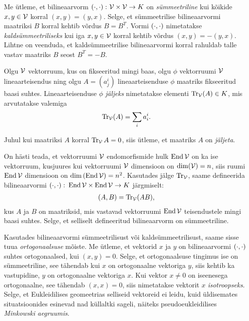 Me ütleme, et bilineaarvorm $\left( \cdot, \cdot \right) \colon \mathcal{V} \times \mathcal{V} \to K$ on
\emph{sümmeetriline} kui
kõikide $x, y \in \mathcal{V}$ korral $(x, y) = (y, x)$. Selge, et sümmeetrilise
bilineaarvormi maatriksi $B$ korral kehtib võrdus $B = B^T$. Vormi $\left( \cdot, \cdot \right)$
nimetatakse \emph{kaldsümmeetriliseks} kui iga $x, y \in \mathcal{V}$ korral kehtib
võrdus $(x, y) = - (y, x)$. Lihtne on veenduda, et kaldsümmeetrilise
bilineaarvormi korral rahuldab talle vastav maatriks $B$ seost
$B^T = -B$.

\begin{dfn}
    Olgu $\mathcal{V}$ vektorruum, kus on fikseeritud mingi baas, olgu $\phi$
    vektorruumi $\mathcal{V}$ lineaarteisendus ning olgu $A = (a^i_j)$
    lineaarteisenduse $\phi$ maatriks fikseeritud baasi suhtes.
    Lineaarteisenduse $\phi$ \emph{jäljeks} nimetatakse elementi
    $\operatorname{Tr}_{\mathcal{V}}(A) \in K$, mis arvutatakse valemiga
    \begin{align*}
        \operatorname{Tr}_{\mathcal{V}}(A) = \sum_i a^i_i.
    \end{align*}
\end{dfn}

Juhul kui maatriksi $A$ korral $\operatorname{Tr}_{\mathcal{V}} A = 0$, siis ütleme, et
maatriks $A$ on \emph{jäljeta}.

\begin{naide}
    On hästi teada, et vektorruumi $\mathcal{V}$ endomorfismide hulk $\operatorname{End} \mathcal{V}$
    on ka ise vektorruum, kusjuures kui vektorruumi $\mathcal{V}$ dimensioon
    on $\dim(\mathcal{V}) = n$, siis ruumi $\operatorname{End} \mathcal{V}$ dimensioon on
    $\dim \left(\operatorname{End} \mathcal{V}\right) = n^2$. Kasutades jälge $\operatorname{Tr}_{\mathcal{V}}$, saame
    defineerida bilineaarvormi
    $\left( \cdot, \cdot \right) \colon \operatorname{End} \mathcal{V} \times \operatorname{End} \mathcal{V} \to K$ järgmiselt:
    \begin{align*}
        (A, B) = \operatorname{Tr}_{\mathcal{V}}(AB),
    \end{align*}
    kus $A$ ja $B$ on maatriksid, mis vastavad vektorruumi $\operatorname{End} \mathcal{V}$
    teisendustele mingi baasi suhtes. Selge, et selliselt defineeritud
    bilineaarvorm on sümmeetriline.
\end{naide}

Kasutades bilineaarvormi sümmeetrilisust või kaldsümmeetrilisust,
saame sisse tuua \emph{ortogonaalsuse} mõiste. Me ütleme, et vektorid $x$ ja
$y$ on bilineaarvormi $\left( \cdot, \cdot \right)$ suhtes ortogonaalsed, kui $(x, y) = 0$. Selge,
et ortogonaalsuse tingimus ise on sümmeetriline, see tähendab kui $x$ on
ortogonaalne vektoriga $y$, siis kehtib ka vastupidine, $y$ on ortogonaalne
vektoriga $x$. Kui vektor $x \neq 0$ on iseenesega ortogonaalne, see tähendab
$(x, x) = 0$, siis nimetatakse vektorit $x$ \emph{isotroopseks}. Selge, et
Eukleidilises geomeetrias selliseid vektoreid ei leidu, kuid üldisemates
situatsioonides esinevad nad küllaltki sageli, näiteks pseudoeukleidilises
\emph{Minkowski aegruumis}.

